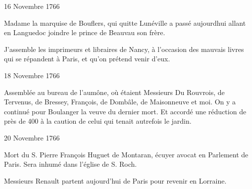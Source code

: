                      \begin{diary}{16 Novembre 1766}{}
                        
                        
                           Madame la marquise de Bouflers, qui quitte
                           Lunéville a passé
                           aujourdhui allant en
                           Languedoc joindre le prince de Beauvau son frère. \bigskip
        
        
                         J’assemble les imprimeurs et libraires
                           de
                           Nancy, à l’occasion des mauvais
                           livres
                           qui se répandent à Paris, et
                           qu’on prétend
                           venir d’eux. \bigskip
        
        
                     \end{diary}

                     \begin{diary}{18 Novembre 1766}{}
                        
                        
                         Assemblée au bureau de l’aumône, où étaient
                           Messieurs
                           Du Rouvrois, de Tervenus, de
                              Bressey,
                           François, de Dombâle, de Maisonneuve et moi.
                           On y a continué pour Boulanger la veuve du
                           dernier mort. Et accordé une réduction de
                           près de 400 à la caution de celui qui
                           tenait autrefois le jardin. \bigskip
        
        
                     \end{diary}

                     \begin{diary}{20 Novembre 1766}{}
                        
                         Mort du S. Pierre François Huguet de
                              Montaran,
                           écuyer avocat en Parlement de
                              Paris. Sera inhumé
                           dans l’église de S. Roch. \bigskip
        
        
                        
                           Messieurs Renault partent aujourd'hui de Paris
                           pour revenir en Lorraine.
                        \bigskip
        
        
                     \end{diary}

